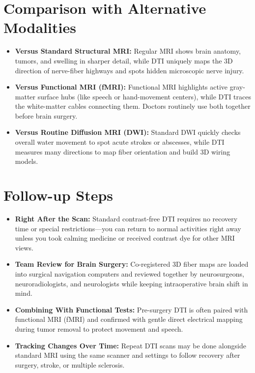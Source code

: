 \section{Comparison with Alternative Modalities}

\begin{itemize}
    \item \textbf{Versus Standard Structural MRI:} Regular MRI shows brain anatomy, tumors, and swelling in sharper detail, while DTI uniquely maps the 3D direction of nerve-fiber highways and spots hidden microscopic nerve injury.
    \item \textbf{Versus Functional MRI (fMRI):} Functional MRI highlights active gray-matter surface hubs (like speech or hand-movement centers), while DTI traces the white-matter cables connecting them. Doctors routinely use both together before brain surgery.
    \item \textbf{Versus Routine Diffusion MRI (DWI):} Standard DWI quickly checks overall water movement to spot acute strokes or abscesses, while DTI measures many directions to map fiber orientation and build 3D wiring models.
\end{itemize}

\section{Follow-up Steps}

\begin{itemize}
    \item \textbf{Right After the Scan:} Standard contrast-free DTI requires no recovery time or special restrictions---you can return to normal activities right away unless you took calming medicine or received contrast dye for other MRI views.
    \item \textbf{Team Review for Brain Surgery:} Co-registered 3D fiber maps are loaded into surgical navigation computers and reviewed together by neurosurgeons, neuroradiologists, and neurologists while keeping intraoperative brain shift in mind.
    \item \textbf{Combining With Functional Tests:} Pre-surgery DTI is often paired with functional MRI (fMRI) and confirmed with gentle direct electrical mapping during tumor removal to protect movement and speech.
    \item \textbf{Tracking Changes Over Time:} Repeat DTI scans may be done alongside standard MRI using the same scanner and settings to follow recovery after surgery, stroke, or multiple sclerosis.
\end{itemize}

